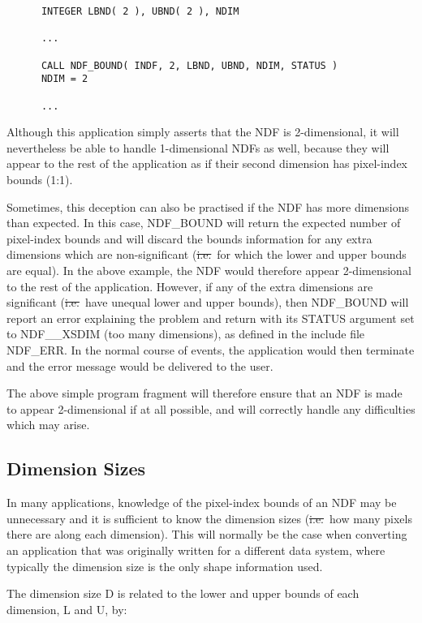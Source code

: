 \small
\begin{verbatim}
      INTEGER LBND( 2 ), UBND( 2 ), NDIM

      ...

      CALL NDF_BOUND( INDF, 2, LBND, UBND, NDIM, STATUS )
      NDIM = 2

      ...
\end{verbatim}
\normalsize

Although this application simply asserts that the NDF is 2-dimensional, it
will nevertheless be able to handle 1-dimensional NDFs as well, because they
will appear to the rest of the application as if their second dimension has
pixel-index bounds (1:1). 

Sometimes, this deception can also be practised if the NDF has more
dimensions than expected. 
In this case, NDF\_BOUND will return the expected number of pixel-index
bounds and will discard the bounds information for any extra dimensions
which are non-significant (\st{i.e.}\ for which the lower and upper bounds
are equal). 
In the above example, the NDF would therefore appear 2-dimensional to the rest
of the application.
However, if any of the extra dimensions are significant (\st{i.e.}\ have
unequal lower and upper bounds), then NDF\_BOUND will report an error
explaining the problem and return with its STATUS argument set to
NDF\_\_XSDIM (too many dimensions), as defined in the include file NDF\_ERR.
In the normal course of events, the application would then terminate and the
error message would be delivered to the user. 

The above simple program fragment will therefore ensure that an NDF is made
to appear 2-dimensional if at all possible, and will correctly handle any
difficulties which may arise. 

\subsection{Dimension Sizes}

In many applications, knowledge of the pixel-index bounds of an NDF may be
unnecessary and it is sufficient to know the dimension sizes (\st{i.e.}\ how
many pixels there are along each dimension). 
This will normally be the case when converting an application that was
originally written for a different data system, where typically the dimension
size is the only shape information used. 

The dimension size D is related to the lower and upper bounds of each
dimension, L and U, by: 

